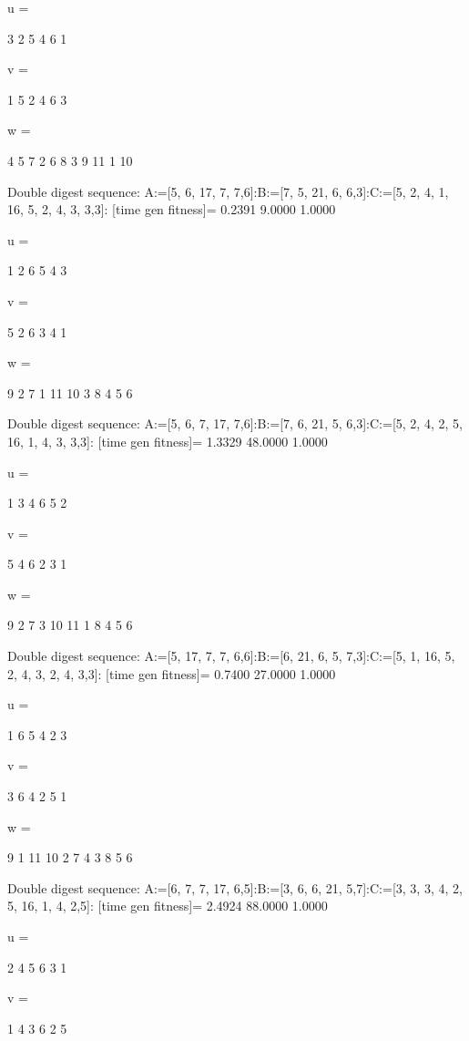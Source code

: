 u =

     3     2     5     4     6     1


v =

     1     5     2     4     6     3


w =

     4     5     7     2     6     8     3     9    11     1    10

Double digest sequence:
A:=[5, 6, 17, 7, 7,6]:B:=[7, 5, 21, 6, 6,3]:C:=[5, 2, 4, 1, 16, 5, 2, 4, 3, 3,3]:
[time gen fitness]=
    0.2391    9.0000    1.0000


u =

     1     2     6     5     4     3


v =

     5     2     6     3     4     1


w =

     9     2     7     1    11    10     3     8     4     5     6

Double digest sequence:
A:=[5, 6, 7, 17, 7,6]:B:=[7, 6, 21, 5, 6,3]:C:=[5, 2, 4, 2, 5, 16, 1, 4, 3, 3,3]:
[time gen fitness]=
    1.3329   48.0000    1.0000


u =

     1     3     4     6     5     2


v =

     5     4     6     2     3     1


w =

     9     2     7     3    10    11     1     8     4     5     6

Double digest sequence:
A:=[5, 17, 7, 7, 6,6]:B:=[6, 21, 6, 5, 7,3]:C:=[5, 1, 16, 5, 2, 4, 3, 2, 4, 3,3]:
[time gen fitness]=
    0.7400   27.0000    1.0000


u =

     1     6     5     4     2     3


v =

     3     6     4     2     5     1


w =

     9     1    11    10     2     7     4     3     8     5     6

Double digest sequence:
A:=[6, 7, 7, 17, 6,5]:B:=[3, 6, 6, 21, 5,7]:C:=[3, 3, 3, 4, 2, 5, 16, 1, 4, 2,5]:
[time gen fitness]=
    2.4924   88.0000    1.0000


u =

     2     4     5     6     3     1


v =

     1     4     3     6     2     5


